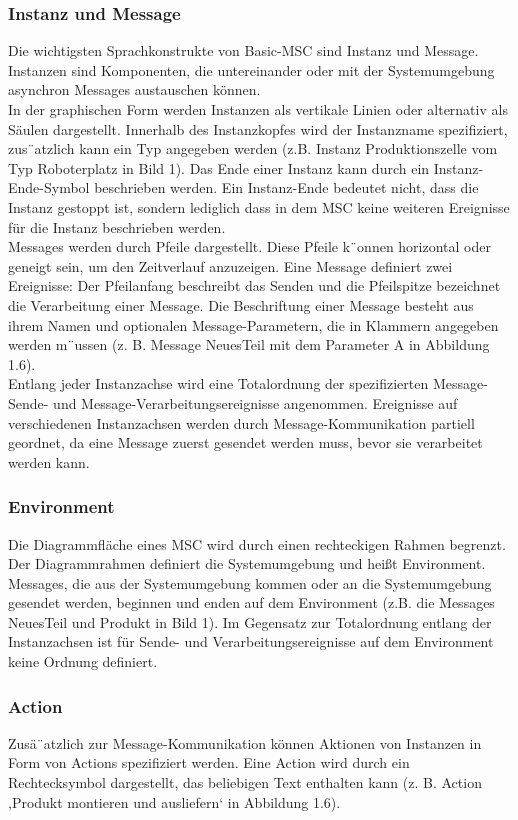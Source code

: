 \subsubsection{Instanz und Message}
Die wichtigsten Sprachkonstrukte von Basic-MSC sind Instanz
und Message. Instanzen sind Komponenten, die untereinander
oder mit der Systemumgebung asynchron Messages
austauschen können.\\
In der graphischen Form werden Instanzen als vertikale
Linien oder alternativ als Säulen dargestellt. Innerhalb
des Instanzkopfes wird der Instanzname spezifiziert,
zus¨atzlich kann ein Typ angegeben werden (z.B. Instanz
Produktionszelle vom Typ Roboterplatz in
Bild 1). Das Ende einer Instanz kann durch ein Instanz-
Ende-Symbol beschrieben werden. Ein Instanz-Ende
bedeutet nicht, dass die Instanz gestoppt ist, sondern lediglich
dass in dem MSC keine weiteren Ereignisse für die
Instanz beschrieben werden.\\
Messages werden durch Pfeile dargestellt. Diese Pfeile
k¨onnen horizontal oder geneigt sein, um den Zeitverlauf
anzuzeigen. Eine Message definiert zwei Ereignisse: Der
Pfeilanfang beschreibt das Senden und die Pfeilspitze bezeichnet
die Verarbeitung einer Message. Die Beschriftung
einer Message besteht aus ihrem Namen und optionalen
Message-Parametern, die in Klammern angegeben werden
m¨ussen (z. B. Message NeuesTeil mit dem Parameter A
in Abbildung 1.6).\\
Entlang jeder Instanzachse wird eine Totalordnung der spezifizierten
Message-Sende- und Message-Verarbeitungsereignisse
angenommen. Ereignisse auf verschiedenen Instanzachsen
werden durch Message-Kommunikation partiell
geordnet, da eine Message zuerst gesendet werden muss,
bevor sie verarbeitet werden kann.
\subsubsection{Environment}
Die Diagrammfläche eines MSC wird durch einen rechteckigen
Rahmen begrenzt. Der Diagrammrahmen definiert
die Systemumgebung und heißt Environment. Messages,
die aus der Systemumgebung kommen oder an die Systemumgebung
gesendet werden, beginnen und enden auf
dem Environment (z.B. die Messages NeuesTeil und
Produkt in Bild 1). Im Gegensatz zur Totalordnung entlang
der Instanzachsen ist für Sende- und Verarbeitungsereignisse
auf dem Environment keine Ordnung definiert.\\
\subsubsection{Action}
Zusä¨atzlich zur Message-Kommunikation können Aktionen
von Instanzen in Form von Actions spezifiziert werden.
Eine Action wird durch ein Rechtecksymbol dargestellt, das
beliebigen Text enthalten kann (z. B. Action ,Produkt
montieren und ausliefern‘ in Abbildung 1.6).\\
